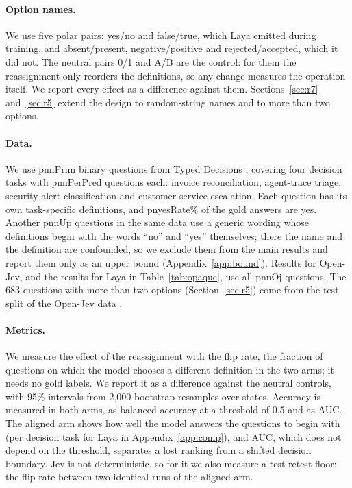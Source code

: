 \documentclass[11pt]{article}
\newcommand{\m}[1]{\csname pn#1\endcsname}       %
\newcommand{\opt}[1]{\textsf{#1}}          %
\begin{document}
\paragraph{Option names.} We use five polar pairs: \opt{yes}/\opt{no} and \opt{false}/\opt{true},
which Laya emitted during training, and \opt{absent}/\opt{present}, \opt{negative}/\opt{positive}
and \opt{rejected}/\opt{accepted}, which it did not. The neutral pairs \opt{0}/\opt{1} and
\opt{A}/\opt{B} are the control: for them the reassignment only reorders the definitions, so any change
measures the operation itself. We report every effect as a difference against them.
Sections~\ref{sec:r7} and~\ref{sec:r5} extend the design to random-string names and to more than
two options.

\paragraph{Data.} We use \m{nPrim} binary questions from Typed Decisions
\citep{localllama2026typed}, covering four decision tasks with \m{nPerPred} questions each: invoice
reconciliation, agent-trace triage, security-alert classification and customer-service escalation.
Each question has its own task-specific definitions, and \m{yesRate}\% of the gold answers are yes.
Another \m{nUp} questions in the same data use a generic wording whose definitions begin with the
words ``no'' and ``yes'' themselves; there the name and the definition are confounded, so we exclude
them from the main results and report them only as an upper bound (Appendix~\ref{app:bound}).
Results for Open-Jev, and the results for Laya in Table~\ref{tab:opaque}, use all \m{nOj}
questions. The 683 questions with more than two options (Section~\ref{sec:r5}) come from the test
split of the Open-Jev data \citep{zefancai2026openjevdata}.

\paragraph{Metrics.} We measure the effect of the reassignment with the flip rate, the fraction of questions
on which the model chooses a different definition in the two arms; it needs no gold labels. We
report it as a difference against the neutral controls, with 95\% intervals from 2,000 bootstrap
resamples over states. Accuracy is measured in both arms, as balanced accuracy at a threshold of 0.5
and as AUC. The aligned arm shows how well the model answers the questions to begin with (per
decision task for Laya in Appendix~\ref{app:comp}), and AUC, which does not depend on the threshold,
separates a lost ranking from a shifted decision boundary. Jev is not deterministic, so for it we
also measure a test-retest floor: the flip rate between two identical runs of the aligned arm.
\end{document}
